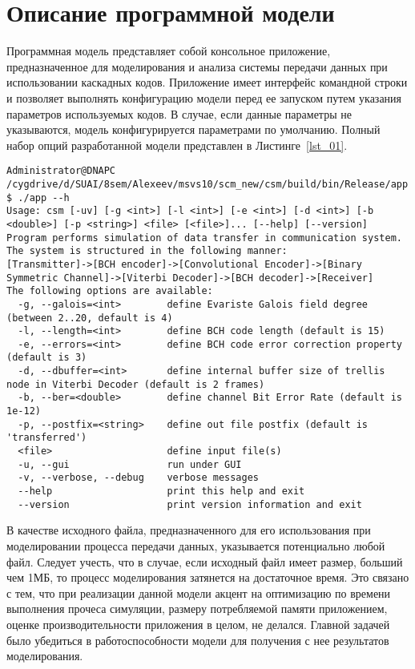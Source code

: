 \chapter{Описание программной модели}
Программная модель представляет собой консольное приложение, предназначенное для моделирования и анализа 
системы передачи данных при использовании каскадных кодов. Приложение имеет интерфейс командной строки и 
позволяет выполнять конфигурацию модели перед ее запуском путем указания параметров используемых кодов. В 
случае, если данные параметры не указываются, модель конфигурируется параметрами по умолчанию. Полный набор 
опций разработанной модели представлен в Листинге~\ref{lst_01}.

\begin{lstlisting}[caption={Вывод информации о доступных опциях}, label={lst_01}]
Administrator@DNAPC /cygdrive/d/SUAI/8sem/Alexeev/msvs10/scm_new/csm/build/bin/Release/app
$ ./app --h
Usage: csm [-uv] [-g <int>] [-l <int>] [-e <int>] [-d <int>] [-b <double>] [-p <string>] <file> [<file>]... [--help] [--version]
Program performs simulation of data transfer in communication system. The system is structured in the following manner:
[Transmitter]->[BCH encoder]->[Convolutional Encoder]->[Binary Symmetric Channel]->[Viterbi Decoder]->[BCH decoder]->[Receiver]
The following options are available:
  -g, --galois=<int>        define Evariste Galois field degree (between 2..20, default is 4)
  -l, --length=<int>        define BCH code length (default is 15)
  -e, --errors=<int>        define BCH code error correction property (default is 3)
  -d, --dbuffer=<int>       define internal buffer size of trellis node in Viterbi Decoder (default is 2 frames)
  -b, --ber=<double>        define channel Bit Error Rate (default is 1e-12)
  -p, --postfix=<string>    define out file postfix (default is 'transferred')
  <file>                    define input file(s)
  -u, --gui                 run under GUI
  -v, --verbose, --debug    verbose messages
  --help                    print this help and exit
  --version                 print version information and exit
\end{lstlisting}

В качестве исходного файла, предназначенного для его использования при моделировании процесса передачи 
данных, указывается потенциально любой файл. Следует учесть, что в случае, если исходный файл имеет размер, 
больший чем 1МБ, то процесс моделирования затянется на достаточное время. Это связано с тем, что при 
реализации данной модели акцент на оптимизацию по времени выполнения прочеса симуляции, размеру потребляемой 
памяти приложением, оценке производительности приложения в целом, не делался. Главной задачей было убедиться 
в работоспособности модели для получения с нее результатов моделирования.

